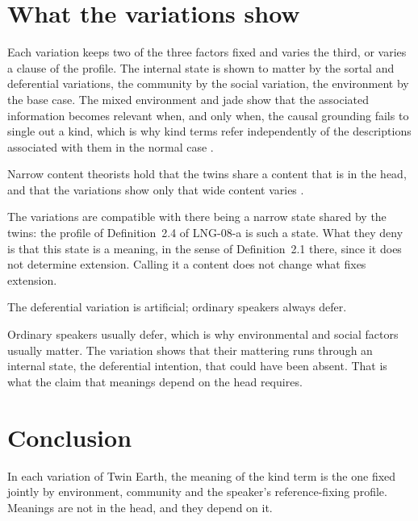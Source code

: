 \documentclass{situationist-preprint}
\begin{document}
\section{What the variations show}

Each variation keeps two of the three factors fixed and varies the third, or varies a clause of the profile. The internal state is shown to matter by the sortal and deferential variations, the community by the social variation, the environment by the base case. The mixed environment and jade show that the associated information becomes relevant when, and only when, the causal grounding fails to single out a kind, which is why kind terms refer independently of the descriptions associated with them in the normal case \citep{Kripke1980}.

\begin{objection}
Narrow content theorists hold that the twins share a content that is in the head, and that the variations show only that wide content varies \citep{Fodor1987}.
\end{objection}

\begin{reply}
The variations are compatible with there being a narrow state shared by the twins: the profile of Definition~2.4 of LNG-08-a is such a state. What they deny is that this state is a meaning, in the sense of Definition~2.1 there, since it does not determine extension. Calling it a content does not change what fixes extension.
\end{reply}

\begin{objection}
The deferential variation is artificial; ordinary speakers always defer.
\end{objection}

\begin{reply}
Ordinary speakers usually defer, which is why environmental and social factors usually matter. The variation shows that their mattering runs through an internal state, the deferential intention, that could have been absent. That is what the claim that meanings depend on the head requires.
\end{reply}

\section{Conclusion}

In each variation of Twin Earth, the meaning of the kind term is the one fixed jointly by environment, community and the speaker's reference-fixing profile. Meanings are not in the head, and they depend on it.
\end{document}
